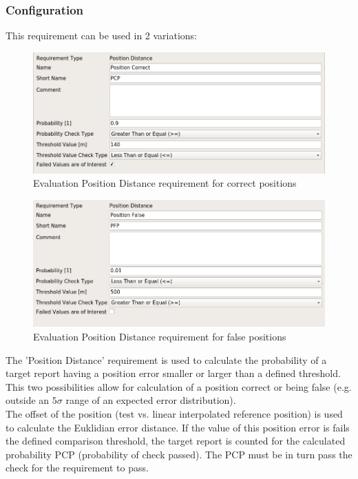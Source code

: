 \subsubsection{Configuration}

This requirement can be used in 2 variations:

\begin{figure}[H]
    \includegraphics[width=14cm,frame]{../screenshots/eval_req_pos_distance_correct.png}
  \caption{Evaluation Position Distance requirement for correct positions}
\end{figure}

\begin{figure}[H]
    \includegraphics[width=14cm,frame]{../screenshots/eval_req_pos_distance_false.png}
  \caption{Evaluation Position Distance requirement for false positions}
\end{figure}

The 'Position Distance' requirement is used to calculate the probability of a target report having a position error smaller or larger than a defined threshold. This two possibilities allow for calculation of a position correct or being false (e.g. outside an $5\sigma$ range of an expected error distribution). \\

The offset of the position (test vs. linear interpolated reference position) is used to calculate the Euklidian error distance. If the  value of this position error is fails the defined comparison threshold, the target report is counted for the calculated probability PCP (probability of check passed). The PCP must be in turn pass the check for the requirement to pass. \\

